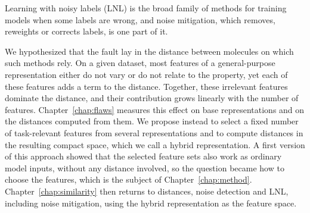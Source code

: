 Learning with noisy labels (LNL) is the broad family of methods for training models when some labels are wrong, and noise mitigation, which removes, reweights or corrects labels, is one part of it.
%

We hypothesized that the fault lay in the distance between molecules on which such methods rely. On a given dataset, most features of a general-purpose representation either do not vary or do not relate to the property, yet each of these features adds a term to the distance. Together, these irrelevant features dominate the distance, and their contribution grows linearly with the number of features. Chapter~\ref{chap:flaws} measures this effect on base representations and on the distances computed from them. We propose instead to select a fixed number of task-relevant features from several representations and to compute distances in the resulting compact space, which we call a hybrid representation. A first version of this approach showed that the selected feature sets also work as ordinary model inputs, without any distance involved, so the question became how to choose the features, which is the subject of Chapter~\ref{chap:method}. Chapter~\ref{chap:similarity} then returns to distances, noise detection and LNL, including noise mitigation, using the hybrid representation as the feature space.

